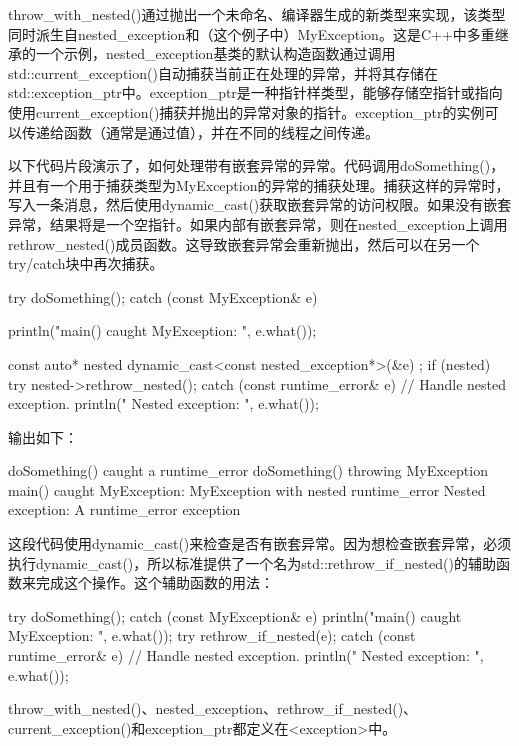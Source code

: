 throw\_with\_nested()通过抛出一个未命名、编译器生成的新类型来实现，该类型同时派生自nested\_exception和（这个例子中）MyException。这是C++中多重继承的一个示例，nested\_exception基类的默认构造函数通过调用std::current\_exception()自动捕获当前正在处理的异常，并将其存储在std::exception\_ptr中。exception\_ptr是一种指针样类型，能够存储空指针或指向使用current\_exception()捕获并抛出的异常对象的指针。exception\_ptr的实例可以传递给函数（通常是通过值），并在不同的线程之间传递。

以下代码片段演示了，如何处理带有嵌套异常的异常。代码调用doSomething()，并且有一个用于捕获类型为MyException的异常的捕获处理。捕获这样的异常时，写入一条消息，然后使用dynamic\_cast()获取嵌套异常的访问权限。如果没有嵌套异常，结果将是一个空指针。如果内部有嵌套异常，则在nested\_exception上调用rethrow\_nested()成员函数。这导致嵌套异常会重新抛出，然后可以在另一个try/catch块中再次捕获。

\begin{cpp}
try {
    doSomething();
} catch (const MyException& e) {
    println("main() caught MyException: {}", e.what());

    const auto* nested { dynamic_cast<const nested_exception*>(&e) };
    if (nested) {
        try {
            nested->rethrow_nested();
        } catch (const runtime_error& e) {
            // Handle nested exception.
            println(" Nested exception: {}", e.what());
        }
    }
}
\end{cpp}

输出如下：

\begin{shell}
doSomething() caught a runtime_error
doSomething() throwing MyException
main() caught MyException: MyException with nested runtime_error
  Nested exception: A runtime_error exception
\end{shell}


这段代码使用dynamic\_cast()来检查是否有嵌套异常。因为想检查嵌套异常，必须执行dynamic\_cast()，所以标准提供了一个名为std::rethrow\_if\_nested()的辅助函数来完成这个操作。这个辅助函数的用法：

\begin{cpp}
try {
    doSomething();
} catch (const MyException& e) {
    println("main() caught MyException: {}", e.what());
    try {
        rethrow_if_nested(e);
    } catch (const runtime_error& e) {
        // Handle nested exception.
        println(" Nested exception: {}", e.what());
    }
}
\end{cpp}

throw\_with\_nested()、nested\_exception、rethrow\_if\_nested()、current\_exception()和exception\_ptr都定义在<exception>中。







